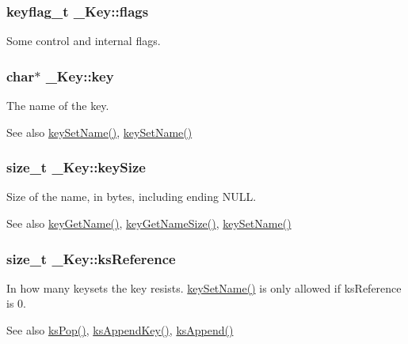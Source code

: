\hypertarget{struct__Key_a84a30dda173b302305eca6af5f766bc7}{
\subsubsection[{flags}]{\setlength{\rightskip}{0pt plus 5cm}keyflag\_\-t {\bf \_\-Key::flags}}}
\label{struct__Key_a84a30dda173b302305eca6af5f766bc7}
Some control and internal flags. \hypertarget{struct__Key_a652aa968b98b0797d4d080b51133fed9}{
\subsubsection[{key}]{\setlength{\rightskip}{0pt plus 5cm}char$\ast$ {\bf \_\-Key::key}}}
\label{struct__Key_a652aa968b98b0797d4d080b51133fed9}
The name of the key. \begin{DoxySeeAlso}{See also}
\hyperlink{group__keyname_ga7699091610e7f3f43d2949514a4b35d9}{keySetName()}, \hyperlink{group__keyname_ga7699091610e7f3f43d2949514a4b35d9}{keySetName()} 
\end{DoxySeeAlso}
\hypertarget{struct__Key_ab05bb76f9e389692dcea59f581e76323}{
\subsubsection[{keySize}]{\setlength{\rightskip}{0pt plus 5cm}size\_\-t {\bf \_\-Key::keySize}}}
\label{struct__Key_ab05bb76f9e389692dcea59f581e76323}
Size of the name, in bytes, including ending NULL. \begin{DoxySeeAlso}{See also}
\hyperlink{group__keyname_gab29a850168d9b31c9529e90cf9ab68be}{keyGetName()}, \hyperlink{group__keyname_gabdbcfa51ed8a387e47ead207affa2d2e}{keyGetNameSize()}, \hyperlink{group__keyname_ga7699091610e7f3f43d2949514a4b35d9}{keySetName()} 
\end{DoxySeeAlso}
\hypertarget{struct__Key_ab8fe2e580d4ab3952a071c25550598ef}{
\subsubsection[{ksReference}]{\setlength{\rightskip}{0pt plus 5cm}size\_\-t {\bf \_\-Key::ksReference}}}
\label{struct__Key_ab8fe2e580d4ab3952a071c25550598ef}
In how many keysets the key resists. \hyperlink{group__keyname_ga7699091610e7f3f43d2949514a4b35d9}{keySetName()} is only allowed if ksReference is 0. \begin{DoxySeeAlso}{See also}
\hyperlink{group__keyset_gae42530b04defb772059de0600159cf69}{ksPop()}, \hyperlink{group__keyset_gaa5a1d467a4d71041edce68ea7748ce45}{ksAppendKey()}, \hyperlink{group__keyset_ga21eb9c3a14a604ee3a8bdc779232e7b7}{ksAppend()} 
\end{DoxySeeAlso}
